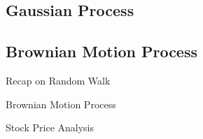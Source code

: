 \documentclass{beamer}
\begin{document}
\subsection{Gaussian Process} 
 
\subsection{Brownian Motion Process}

\begin{frame}{Recap on Random Walk}

\end{frame}


\begin{frame}{Brownian Motion Process}

\end{frame}

\begin{frame}{Stock Price Analysis}

\end{frame}
\end{document}
